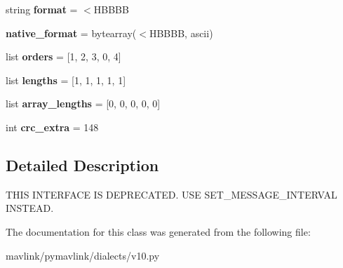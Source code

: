 \begin{DoxyCompactItemize}
string {\bfseries format} = \textquotesingle{}$<$H\+B\+B\+BB\textquotesingle{}
\item 
\mbox{\label{classpymavlink_1_1dialects_1_1v10_1_1MAVLink__request__data__stream__message_a778e4438538e01d3e40b124e7a006e4b}} 
{\bfseries native\+\_\+format} = bytearray(\textquotesingle{}$<$H\+B\+B\+BB\textquotesingle{}, \textquotesingle{}ascii\textquotesingle{})
\item 
\mbox{\label{classpymavlink_1_1dialects_1_1v10_1_1MAVLink__request__data__stream__message_a746957602db161b021bd4179713f8b7c}} 
list {\bfseries orders} = \mbox{[}1, 2, 3, 0, 4\mbox{]}
\item 
\mbox{\label{classpymavlink_1_1dialects_1_1v10_1_1MAVLink__request__data__stream__message_a1450c78b7c425080efcd3bdbc7daafc5}} 
list {\bfseries lengths} = \mbox{[}1, 1, 1, 1, 1\mbox{]}
\item 
\mbox{\label{classpymavlink_1_1dialects_1_1v10_1_1MAVLink__request__data__stream__message_a3157efff5e7301c68f184792b22b9cd7}} 
list {\bfseries array\+\_\+lengths} = \mbox{[}0, 0, 0, 0, 0\mbox{]}
\item 
\mbox{\label{classpymavlink_1_1dialects_1_1v10_1_1MAVLink__request__data__stream__message_ac91844b8187ac5619d697598a731930d}} 
int {\bfseries crc\+\_\+extra} = 148
\end{DoxyCompactItemize}


\subsection{Detailed Description}
\begin{DoxyVerb}THIS INTERFACE IS DEPRECATED. USE SET_MESSAGE_INTERVAL
INSTEAD.
\end{DoxyVerb}
 

The documentation for this class was generated from the following file\+:\begin{DoxyCompactItemize}
\item 
mavlink/pymavlink/dialects/v10.\+py\end{DoxyCompactItemize}
